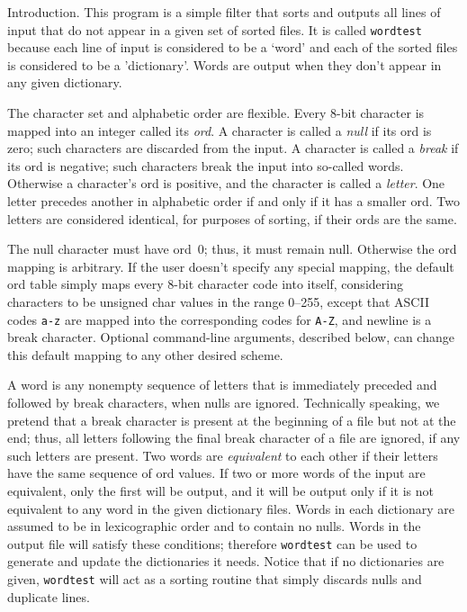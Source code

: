 
\datethis

Introduction. This program is a simple filter that sorts and outputs
all
lines of input that do not appear in a given set of sorted files. It is called
{\tt wordtest} because each line of input is considered to be a `word' and
each of the sorted files is considered to be a 'dictionary'. Words are
output when they don't appear in any given dictionary.

The character set and alphabetic order are flexible. Every 8-bit
character is mapped into an integer called its {\it ord}. A character
is called a {\it null\/} if its ord is zero; such characters are
discarded from the input. A character is called a {\it break\/} if
its ord is negative; such characters break the input into so-called words.
Otherwise a character's ord is positive, and the character is called a
{\it letter}. One letter precedes another in alphabetic order if and only
if it has a smaller ord. Two letters are considered identical, for
purposes of sorting, if their ords are the same.

The null character  must have ord~0; thus, it must remain null.
Otherwise the ord mapping is arbitrary. If the user doesn't specify
any special mapping, the default ord table simply maps every 8-bit
character code into itself, considering characters to be unsigned char
values in the range 0--255, except that ASCII codes {\tt a-z} are
mapped into the corresponding codes for {\tt A-Z}, and newline is a
break character. Optional command-line arguments, described below, can
change this default mapping to any other desired scheme.

A word is any nonempty sequence of letters that is immediately preceded
and followed by break characters, when nulls are ignored. Technically
speaking, we pretend that a break character is present at the beginning of a
file but not at the end; thus, all letters following the final break character
of a file are ignored, if any such letters are present. Two words are
{\it equivalent\/} to each other if their letters have the same sequence
of ord values. If two or more words of the input are equivalent, only
the first will be output, and it will be output only if it is not
equivalent to any word in the given dictionary files. Words in each
dictionary are assumed to be in lexicographic order and to contain no
nulls. Words in the output file will satisfy these conditions; therefore
{\tt wordtest} can be used to generate and update the dictionaries it needs.
Notice that if no dictionaries are given, {\tt wordtest} will act as a
sorting routine that simply discards nulls and duplicate lines.

